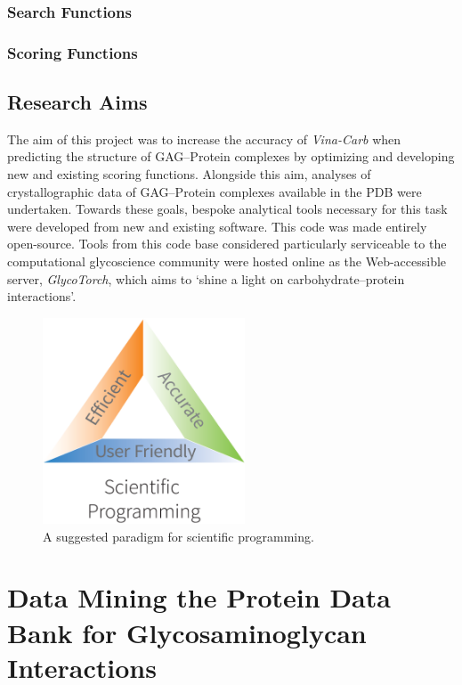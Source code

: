 \documentclass[a4paper, 12pt, openany]{book}
\begin{document}
\subsection{Search Functions}
\subsection{Scoring Functions}

\newpage
\section{Research Aims}
\noindent The aim of this project was to increase the accuracy of \textit{Vina-Carb} when predicting the structure of \acs{GAG}--Protein complexes by optimizing and developing new and existing scoring functions.
Alongside this aim, analyses of crystallographic data of \acs{GAG}--Protein complexes available in the \ac{PDB} were undertaken. 
Towards these goals, bespoke analytical tools necessary for this task were developed from new and existing software. This code was made entirely open-source. 
Tools from this code base considered particularly serviceable to the computational glycoscience community were hosted online as the Web-accessible server, \textit{GlycoTorch}, which aims to `shine a light on carbohydrate--protein interactions'.


\begin{figure}[h]
    \centering
    \includegraphics[width=6cm]{Figures/Intro/scientific_programming.eps}
    \caption{A suggested paradigm for scientific programming.}
    \label{fig:my_label}
\end{figure}



\chapter{Data Mining the Protein Data Bank for Glycosaminoglycan Interactions}
\end{document}
